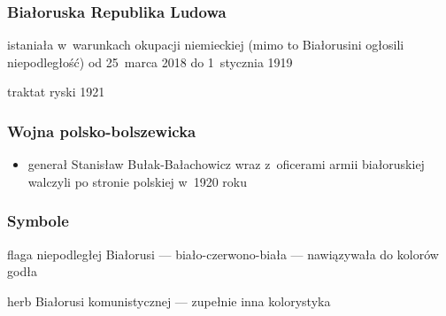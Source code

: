 \subsubsection*{Białoruska Republika Ludowa}
\begin{description}
    \item istaniała w~warunkach okupacji niemieckiej (mimo to Białorusini ogłosili niepodległość) od 25~marca 2018 do 1~stycznia 1919
    \item traktat ryski 1921
\end{description}
\subsubsection*{Wojna polsko-bolszewicka}
\begin{itemize}
    \item generał Stanisław Bułak-Bałachowicz wraz z~oficerami armii białoruskiej walczyli po stronie polskiej w~1920 roku
\end{itemize}
\subsubsection*{Symbole}
\begin{description}
    \item flaga niepodległej Białorusi --- biało-czerwono-biała --- nawiązywała do kolorów godła
    \item herb Białorusi komunistycznej --- zupełnie inna kolorystyka
\end{description}
